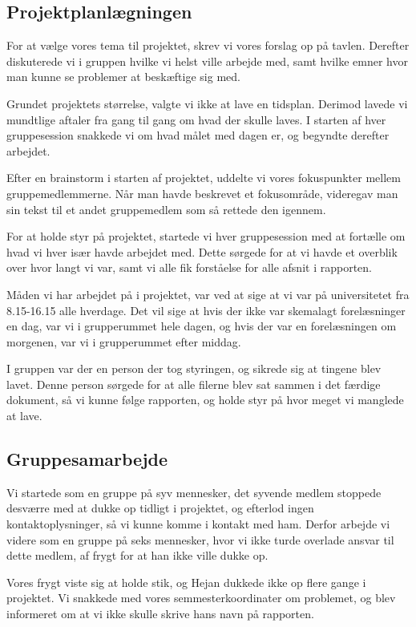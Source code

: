 \subsection*{Projektplanlægningen}
For at vælge vores tema til projektet, skrev vi vores forslag op på tavlen. Derefter diskuterede vi i gruppen hvilke vi helst ville arbejde med, samt hvilke emner hvor man kunne se problemer at beskæftige sig med.

Grundet projektets størrelse, valgte vi ikke at lave en tidsplan. Derimod lavede vi mundtlige aftaler fra gang til gang om hvad der skulle laves. I starten af hver gruppesession snakkede vi om hvad målet med dagen er, og begyndte derefter arbejdet. 

Efter en brainstorm i starten af projektet, uddelte vi vores fokuspunkter mellem gruppemedlemmerne. Når man havde beskrevet et fokusområde, videregav man sin tekst til et andet gruppemedlem som så rettede den igennem. 

For at holde styr på projektet, startede vi hver gruppesession med at fortælle om hvad vi hver især havde arbejdet med. Dette sørgede for at vi havde et overblik over hvor langt vi var, samt vi alle fik forståelse for alle afsnit i rapporten.

Måden vi har arbejdet på i projektet, var ved at sige at vi var på universitetet fra 8.15-16.15 alle hverdage. Det vil sige at hvis der ikke var skemalagt forelæsninger en dag, var vi i grupperummet hele dagen, og hvis der var en forelæsningen om morgenen, var vi i grupperummet efter middag.

I gruppen var der en person der tog styringen, og sikrede sig at tingene blev lavet. Denne person sørgede for at alle filerne blev sat sammen i det færdige dokument, så vi kunne følge rapporten, og holde styr på hvor meget vi manglede at lave.

\subsection*{Gruppesamarbejde}
Vi startede som en gruppe på syv mennesker, det syvende medlem stoppede desværre med at dukke op tidligt i projektet, og efterlod ingen kontaktoplysninger, så vi kunne komme i kontakt med ham. Derfor arbejde vi videre som en gruppe på seks mennesker, hvor vi ikke turde overlade ansvar til dette medlem, af frygt for at han ikke ville dukke op.

Vores frygt viste sig at holde stik, og Hejan dukkede ikke op flere gange i projektet. Vi snakkede med vores semmesterkoordinater om problemet, og blev informeret om at vi ikke skulle skrive hans navn på rapporten.  

